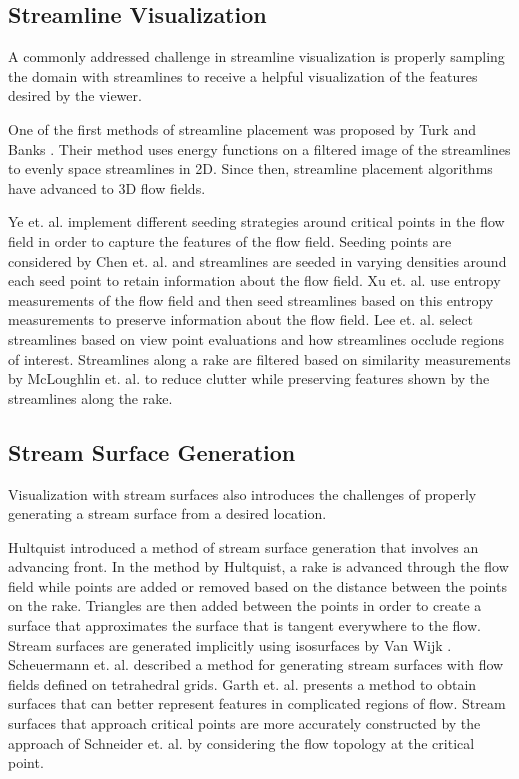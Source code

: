 \documentclass{vgtc}                          %
\begin{document}
\subsection{Streamline Visualization}

A commonly addressed challenge in streamline visualization is properly sampling the domain with streamlines to receive a helpful visualization of the features desired by the viewer.

One of the first methods of streamline placement was proposed by Turk and Banks \cite{Turk1996}.
Their method uses energy functions on a filtered image of the streamlines to evenly space streamlines in 2D.
Since then, streamline placement algorithms have advanced to 3D flow fields.

Ye et. al. \cite{Ye} implement different seeding strategies around critical points in the flow field in order to capture the features of the flow field.
Seeding points are considered by Chen et. al. \cite{Chen2007} and streamlines are seeded in varying densities around each seed point to retain information about the flow field.
Xu et. al. \cite{Xu2010} use entropy measurements of the flow field and then seed streamlines based on this entropy measurements to preserve information about the flow field.
Lee et. al. \cite{Lee2011} select streamlines based on view point evaluations and how streamlines occlude regions of interest.
Streamlines along a rake are filtered based on similarity measurements by McLoughlin et. al. \cite{McLoughlin2013} to reduce clutter while preserving features shown by the streamlines along the rake.

\subsection{Stream Surface Generation}

Visualization with stream surfaces also introduces the challenges of properly generating a stream surface from a desired location.

Hultquist \cite{Hultquist} introduced a method of stream surface generation that involves an advancing front.
In the method by Hultquist, a rake is advanced through the flow field while points are added or removed based on the distance between the points on the rake.
Triangles are then added between the points in order to create a surface that approximates the surface that is tangent everywhere to the flow.
Stream surfaces are generated implicitly using isosurfaces by Van Wijk \cite{Wijk}.
Scheuermann et. al. \cite{Scheuermann} described a method for generating stream surfaces with flow fields defined on tetrahedral grids.
Garth et. al. \cite{Garth2004} presents a method to obtain surfaces that can better represent features in complicated regions of flow.
Stream surfaces that approach critical points are more accurately constructed by the approach of Schneider et. al. \cite{Schneider2010} by considering the flow topology at the critical point.
\end{document}
